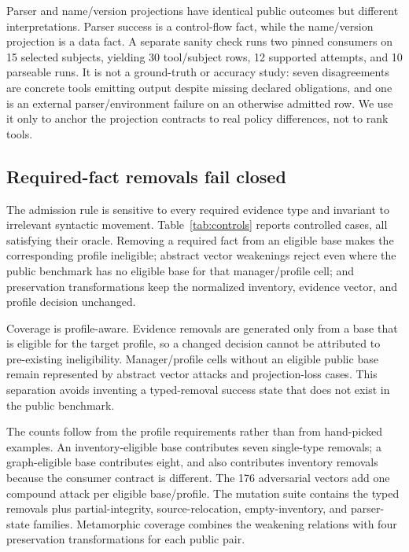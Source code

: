 \documentclass[10pt,conference]{IEEEtran}
\begin{document}
Parser and name/version projections have identical public outcomes but different interpretations. Parser success is a control-flow fact, while the name/version projection is a data fact. A separate sanity check runs two pinned consumers on 15 selected subjects, yielding 30 tool/subject rows, 12 supported attempts, and 10 parseable runs. It is not a ground-truth or accuracy study: seven disagreements are concrete tools emitting output despite missing declared obligations, and one is an external parser/environment failure on an otherwise admitted row. We use it only to anchor the projection contracts to real policy differences, not to rank tools.

\subsection{Required-fact removals fail closed}
The admission rule is sensitive to every required evidence type and invariant to irrelevant syntactic movement. Table~\ref{tab:controls} reports \ControlledCases{} controlled cases, all satisfying their oracle. Removing a required fact from an eligible base makes the corresponding profile ineligible; abstract vector weakenings reject even where the public benchmark has no eligible base for that manager/profile cell; and preservation transformations keep the normalized inventory, evidence vector, and profile decision unchanged.

\begin{table}[t]
\caption{Construct-validation suites. The intended relation is pass equals cases; bold pass counts mark suites with complete oracle agreement.}
\centering\small

\label{tab:controls}
\end{table}

Coverage is profile-aware. Evidence removals are generated only from a base that is eligible for the target profile, so a changed decision cannot be attributed to pre-existing ineligibility. Manager/profile cells without an eligible public base remain represented by abstract vector attacks and projection-loss cases. This separation avoids inventing a typed-removal success state that does not exist in the public benchmark.

The counts follow from the profile requirements rather than from hand-picked examples. An inventory-eligible base contributes seven single-type removals; a graph-eligible base contributes eight, and also contributes inventory removals because the consumer contract is different. The 176 adversarial vectors add one compound attack per eligible base/profile. The mutation suite contains the typed removals plus partial-integrity, source-relocation, empty-inventory, and parser-state families. Metamorphic coverage combines the weakening relations with four preservation transformations for each public pair.
\end{document}
